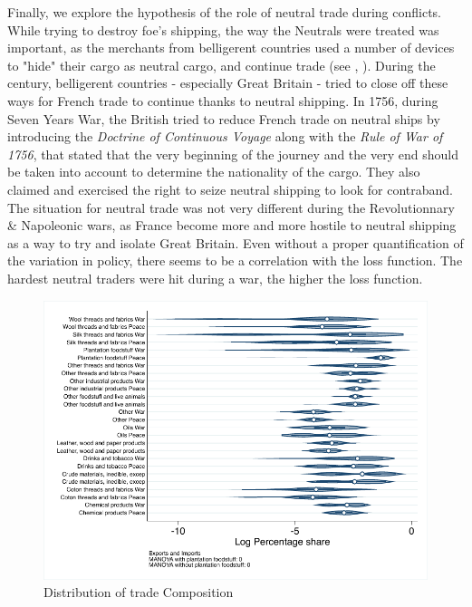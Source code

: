 \documentclass[12pt,a4paper,notitlepage]{article}
\begin{document}
Finally, we explore the hypothesis of the role of neutral trade during conflicts. 
While trying to destroy foe's shipping, the way the Neutrals were treated was important, as the merchants from belligerent countries used a number of devices to "hide" their cargo as neutral cargo, and continue trade (see \citep{carriere1973negociants}, \cite{schnakenbourg2013guerre}). 
During the century, belligerent countries - especially Great Britain - tried to close off these ways for French trade to continue thanks to neutral shipping.
In 1756, during Seven Years War, the British tried to reduce French trade on neutral ships by introducing the \textit{Doctrine of Continuous Voyage} along with the \textit{Rule of War of 1756}, that stated that the very beginning of the journey and the very end should be taken into account to determine the nationality of the cargo.
They also claimed and exercised the right to seize neutral shipping to look for contraband.
The situation for neutral trade was not very different during the Revolutionnary \& Napoleonic wars, as France become more and more hostile to neutral shipping as a way to try and isolate Great Britain. Even without a proper quantification of the variation in policy, there seems to be a correlation with the loss function. The hardest neutral traders were hit during a war, the higher the loss function. 
\begin{figure}
\includegraphics[scale=.7]{peace_war_national_distribution_XI.pdf}
\caption{Distribution of trade Composition}
\label{peace_war_national_distribution_XI}
\end{figure}
\end{document}
